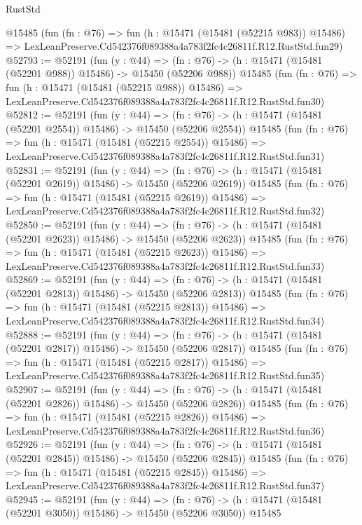 \begin{lexlean}{RustStd}
\begin{coremodule}
    @15485
    (fun (fn : @76) =>
    fun (h : @15471 (@15481 (@52215 @983)) @15486) =>
    LexLeanPreserve.Cd542376f089388a4a783f2fc4c26811f.R12.RustStd.fun29)
@52793 := @52191
    (fun (y : @44) =>
    (fn : @76) -> (h : @15471 (@15481 (@52201 @988)) @15486) -> @15450 (@52206 @988))
    @15485
    (fun (fn : @76) =>
    fun (h : @15471 (@15481 (@52215 @988)) @15486) =>
    LexLeanPreserve.Cd542376f089388a4a783f2fc4c26811f.R12.RustStd.fun30)
@52812 := @52191
    (fun (y : @44) =>
    (fn : @76) -> (h : @15471 (@15481 (@52201 @2554)) @15486) -> @15450 (@52206 @2554))
    @15485
    (fun (fn : @76) =>
    fun (h : @15471 (@15481 (@52215 @2554)) @15486) =>
    LexLeanPreserve.Cd542376f089388a4a783f2fc4c26811f.R12.RustStd.fun31)
@52831 := @52191
    (fun (y : @44) =>
    (fn : @76) -> (h : @15471 (@15481 (@52201 @2619)) @15486) -> @15450 (@52206 @2619))
    @15485
    (fun (fn : @76) =>
    fun (h : @15471 (@15481 (@52215 @2619)) @15486) =>
    LexLeanPreserve.Cd542376f089388a4a783f2fc4c26811f.R12.RustStd.fun32)
@52850 := @52191
    (fun (y : @44) =>
    (fn : @76) -> (h : @15471 (@15481 (@52201 @2623)) @15486) -> @15450 (@52206 @2623))
    @15485
    (fun (fn : @76) =>
    fun (h : @15471 (@15481 (@52215 @2623)) @15486) =>
    LexLeanPreserve.Cd542376f089388a4a783f2fc4c26811f.R12.RustStd.fun33)
@52869 := @52191
    (fun (y : @44) =>
    (fn : @76) -> (h : @15471 (@15481 (@52201 @2813)) @15486) -> @15450 (@52206 @2813))
    @15485
    (fun (fn : @76) =>
    fun (h : @15471 (@15481 (@52215 @2813)) @15486) =>
    LexLeanPreserve.Cd542376f089388a4a783f2fc4c26811f.R12.RustStd.fun34)
@52888 := @52191
    (fun (y : @44) =>
    (fn : @76) -> (h : @15471 (@15481 (@52201 @2817)) @15486) -> @15450 (@52206 @2817))
    @15485
    (fun (fn : @76) =>
    fun (h : @15471 (@15481 (@52215 @2817)) @15486) =>
    LexLeanPreserve.Cd542376f089388a4a783f2fc4c26811f.R12.RustStd.fun35)
@52907 := @52191
    (fun (y : @44) =>
    (fn : @76) -> (h : @15471 (@15481 (@52201 @2826)) @15486) -> @15450 (@52206 @2826))
    @15485
    (fun (fn : @76) =>
    fun (h : @15471 (@15481 (@52215 @2826)) @15486) =>
    LexLeanPreserve.Cd542376f089388a4a783f2fc4c26811f.R12.RustStd.fun36)
@52926 := @52191
    (fun (y : @44) =>
    (fn : @76) -> (h : @15471 (@15481 (@52201 @2845)) @15486) -> @15450 (@52206 @2845))
    @15485
    (fun (fn : @76) =>
    fun (h : @15471 (@15481 (@52215 @2845)) @15486) =>
    LexLeanPreserve.Cd542376f089388a4a783f2fc4c26811f.R12.RustStd.fun37)
@52945 := @52191
    (fun (y : @44) =>
    (fn : @76) -> (h : @15471 (@15481 (@52201 @3050)) @15486) -> @15450 (@52206 @3050))
    @15485

\end{coremodule}
\end{lexlean}
